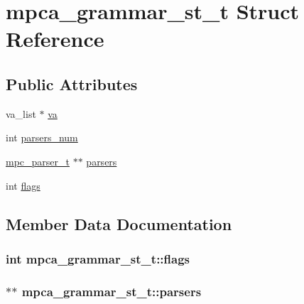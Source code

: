 \hypertarget{structmpca__grammar__st__t}{}\section{mpca\+\_\+grammar\+\_\+st\+\_\+t Struct Reference}
\label{structmpca__grammar__st__t}
\subsection*{Public Attributes}
\begin{DoxyCompactItemize}
\item 
va\+\_\+list $\ast$ \hyperlink{structmpca__grammar__st__t_a08c5f07414915aaa72c44022dd134a4b}{va}
\item 
int \hyperlink{structmpca__grammar__st__t_a765a51c2b312dd68d7667ceb2b265603}{parsers\+\_\+num}
\item 
\hyperlink{structmpc__parser__t}{mpc\+\_\+parser\+\_\+t} $\ast$$\ast$ \hyperlink{structmpca__grammar__st__t_ab31334a374212721abef82ae86924000}{parsers}
\item 
int \hyperlink{structmpca__grammar__st__t_aa79cc99a3dfab77b3cb62920b489a17a}{flags}
\end{DoxyCompactItemize}


\subsection{Member Data Documentation}
\hypertarget{structmpca__grammar__st__t_aa79cc99a3dfab77b3cb62920b489a17a}{}
\subsubsection[{flags}]{\setlength{\rightskip}{0pt plus 5cm}int mpca\+\_\+grammar\+\_\+st\+\_\+t\+::flags}\label{structmpca__grammar__st__t_aa79cc99a3dfab77b3cb62920b489a17a}
\hypertarget{structmpca__grammar__st__t_ab31334a374212721abef82ae86924000}{}
\subsubsection[{parsers}]{$\ast$$\ast$ mpca\+\_\+grammar\+\_\+st\+\_\+t\+::parsers}\label{structmpca__grammar__st__t_ab31334a374212721abef82ae86924000}
\hypertarget{structmpca__grammar__st__t_a765a51c2b312dd68d7667ceb2b265603}{}
